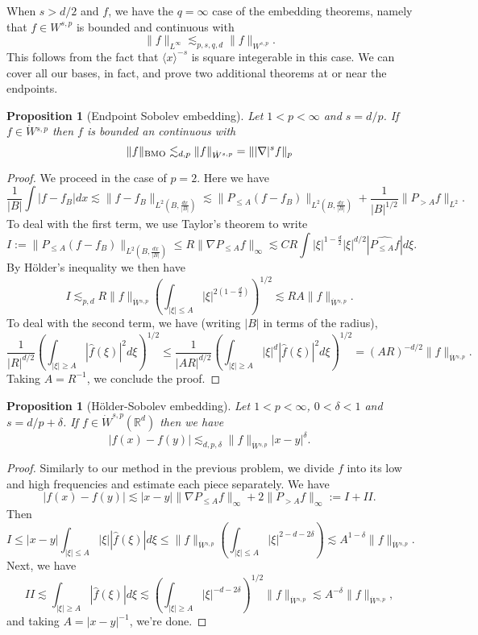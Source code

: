 \documentclass[11pt]{article}
\newtheorem{prop}[thm]{Proposition}
\theoremstyle{remark}
\newcommand{\1}{\textbf{1}}
\newcommand{\lle}{\lesssim}
\newcommand{\BMO}{\textup{BMO}}
\def\norm#1{\| #1  \|}
\def\brac#1{\langle #1  \rangle}
\newcommand{\bbR}{\mathbb{R}}
\begin{document}
When $s > d/2$ and $f$, we have the $q= \infty$ case of the embedding theorems, namely that $f \in W^{s,p}$ is bounded and continuous with
\[
\norm{f}_{L^\infty} \lle_{p,s,q,d} \norm{f}_{W^{s,p}}.
\]
This follows from the fact that $\brac{x}^{-s}$ is square integerable in this case. We can cover all our bases, in fact, and prove two additional theorems at or near the endpoints.
\begin{prop}[Endpoint Sobolev embedding] Let $1 < p < \infty$ and $s = d/p$. If $f \in \dot W{}^{s,p}$ then $f$ is bounded an continuous with
\[
\norm{f}_{\BMO} \lle_{d,p} \norm{f}_{\dot W^{s,p}} = \norm{|\nabla|^s f}_{p}
\]
\end{prop}
\begin{proof}
We proceed in the case of $p = 2$. Here we have
\[
\frac{1}{|B|}\int |f - f_B| dx \lle \norm{f - f_B}_{L^2(B,\frac{dx}{|B|})} \lle \norm{P_{\leq A}(f - f_B)}_{L^2(B,\frac{dx}{|B|})} + \frac{1}{|B|^{1/2}} \norm{P_{>A} f}_{L^2}.
\]
To deal with the first term, we use Taylor's theorem to write
\[
I:= \norm{P_{\leq A}(f - f_B)}_{L^2(B,\frac{dx}{|B|})} \leq R \norm{\nabla P_{\leq A} f}_{\infty} \lle C R \int |\xi|^{1-\frac{d}{2}} |\xi|^{d/2} |\widehat{P_{\leq A} f} | d\xi.
\]
By H\"older's inequality we then have
\[
I \lle_{p,d} R \norm{f}_{\dot W{}^{s,p}} \left( \int_{|\xi| \leq A} |\xi|^{2(1-\frac{d}{2}) } \right)^{1/2} \lle R A \norm{f}_{\dot W{}^{s,p}}.
\]
To deal with the second term, we have (writing $|B|$ in terms of the radius),
\[
\frac{1}{|R|^{d/2}} \left(\int_{|\xi| \geq A} |\hat{f}(\xi)|^2 d\xi \right)^{1/2} \leq \frac{1}{|AR|^{d/2}} \left(\int_{|\xi| \geq A} |\xi|^d |\hat{f}(\xi)|^2 d\xi \right)^{1/2} = (AR)^{-d/2} \norm{f}_{\dot W{}^{s,p}}.
\]
Taking $A = R^{-1}$, we conclude the proof.
\end{proof}
\begin{prop}[H\"older-Sobolev embedding] Let $1 < p < \infty$, $0 < \delta < 1$ and $s = d/p + \delta$. If $f \in \dot W^{s,p}(\bbR^d)$ then we have
\[
|f(x) - f(y) | \lle_{d,p,\delta} \norm{f}_{\dot W{}^{s,p}} |x-y|^\delta.
\]
\end{prop}
\begin{proof}
Similarly to our method in the previous problem, we divide $f$ into its low and high frequencies and estimate each piece separately. We have
\[
|f(x) - f(y)| \lle |x-y| \norm{\nabla P_{\leq A} f}_\infty + 2 \|P_{>A} f\|_\infty := I + II. 
\]
Then
\[
I \leq |x-y| \int_{|\xi| \leq A} |\xi||\hat{f}(\xi)| d\xi \leq \norm{f}_{\dot W{}^{s,p}} \left(\int_{|\xi| \leq A} |\xi|^{2 - d - 2\delta}\right) \lle A^{1-\delta} \norm{f}_{\dot W{}^{s,p}}.
\]
Next, we have
\[
II \lle \int_{|\xi| \geq A} |\hat{f}(\xi)| d\xi \lle \left(\int_{|\xi| \geq A} 
|\xi|^{-d - 2\delta} \right)^{1/2}\norm{f}_{\dot W{}^{s,p}} \lle A^{-\delta} \norm{f}_{\dot W{}^{s,p}},
\]
and taking $A = |x-y|^{-1}$, we're done.
\end{proof}
\end{document}

